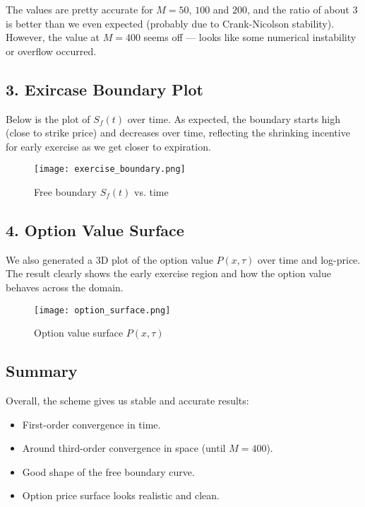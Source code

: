 \documentclass{article}
\begin{document}
\noindent The values are pretty accurate for $M=50$, $100$ and $200$, and the ratio of about 3 is better than we even expected (probably due to Crank-Nicolson stability). However, the value at $M=400$ seems off — looks like some numerical instability or overflow occurred.

\subsection*{3. Exircase Boundary Plot}

Below is the plot of $S_f(t)$ over time. As expected, the boundary starts high (close to strike price) and decreases over time, reflecting the shrinking incentive for early exercise as we get closer to expiration.

\begin{figure}[h]
\centering
\texttt{[image: exercise\_boundary.png]}
\caption{Free boundary $S_f(t)$ vs. time}
\end{figure}

\subsection*{4. Option Value Surface}

We also generated a 3D plot of the option value $P(x,\tau)$ over time and log-price. The result clearly shows the early exercise region and how the option value behaves across the domain.

\begin{figure}[h]
\centering
\texttt{[image: option\_surface.png]}
\caption{Option value surface $P(x, \tau)$}
\end{figure}

\subsection*{Summary}

Overall, the scheme gives us stable and accurate results:
\begin{itemize}
    \item First-order convergence in time.
    \item Around third-order convergence in space (until $M=400$).
    \item Good shape of the free boundary curve.
    \item Option price surface looks realistic and clean.
\end{itemize}
\end{document}
